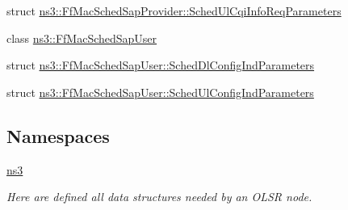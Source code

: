 \begin{DoxyCompactItemize}
\item 
struct \hyperlink{structns3_1_1FfMacSchedSapProvider_1_1SchedUlCqiInfoReqParameters}{ns3\+::\+Ff\+Mac\+Sched\+Sap\+Provider\+::\+Sched\+Ul\+Cqi\+Info\+Req\+Parameters}
\item 
class \hyperlink{classns3_1_1FfMacSchedSapUser}{ns3\+::\+Ff\+Mac\+Sched\+Sap\+User}
\item 
struct \hyperlink{structns3_1_1FfMacSchedSapUser_1_1SchedDlConfigIndParameters}{ns3\+::\+Ff\+Mac\+Sched\+Sap\+User\+::\+Sched\+Dl\+Config\+Ind\+Parameters}
\item 
struct \hyperlink{structns3_1_1FfMacSchedSapUser_1_1SchedUlConfigIndParameters}{ns3\+::\+Ff\+Mac\+Sched\+Sap\+User\+::\+Sched\+Ul\+Config\+Ind\+Parameters}
\end{DoxyCompactItemize}
\subsection*{Namespaces}
\begin{DoxyCompactItemize}
\item 
 \hyperlink{namespacens3}{ns3}
\begin{DoxyCompactList}\small\item\em Here are defined all data structures needed by an O\+L\+SR node. \end{DoxyCompactList}\end{DoxyCompactItemize}
